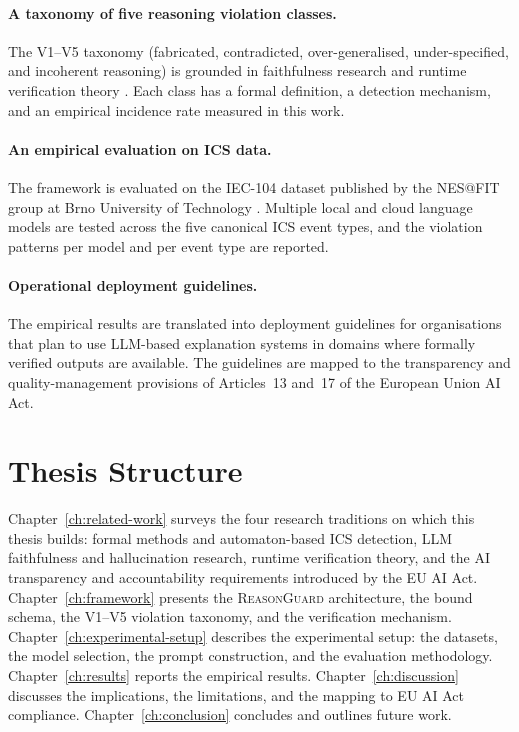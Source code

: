 \paragraph{A taxonomy of five reasoning violation classes.}
The V1--V5 taxonomy (fabricated, contradicted, over-generalised, under-specified, and
incoherent reasoning) is grounded in faithfulness research
\autocite{Maynez2020Faithfulness} and runtime verification theory
\autocite{LeuckerSchallhart2009RuntimeVerification}. Each class has a formal
definition, a detection mechanism, and an empirical incidence rate measured in this
work.

\paragraph{An empirical evaluation on ICS data.}
The framework is evaluated on the IEC-104 dataset published by the NES@FIT group at
Brno University of Technology \autocite{HolikMatousekRysavyVojnar2023}. Multiple
local and cloud language models are tested across the five canonical ICS event types,
and the violation patterns per model and per event type are reported.

\paragraph{Operational deployment guidelines.}
The empirical results are translated into deployment guidelines for organisations that
plan to use LLM-based explanation systems in domains where formally verified outputs
are available. The guidelines are mapped to the transparency and quality-management
provisions of Articles~13 and~17 of the European Union AI Act.

\section{Thesis Structure}
\label{sec:structure}

Chapter~\ref{ch:related-work} surveys the four research traditions on which this
thesis builds: formal methods and automaton-based ICS detection, LLM faithfulness and
hallucination research, runtime verification theory, and the AI transparency and
accountability requirements introduced by the EU AI Act.
Chapter~\ref{ch:framework} presents the \textsc{ReasonGuard} architecture, the bound
schema, the V1--V5 violation taxonomy, and the verification mechanism.
Chapter~\ref{ch:experimental-setup} describes the experimental setup: the datasets,
the model selection, the prompt construction, and the evaluation methodology.
Chapter~\ref{ch:results} reports the empirical results.
Chapter~\ref{ch:discussion} discusses the implications, the limitations, and the
mapping to EU AI Act compliance.
Chapter~\ref{ch:conclusion} concludes and outlines future work.
